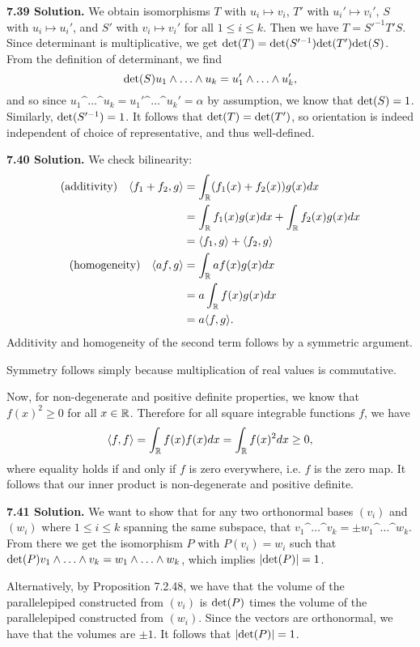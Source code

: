 \textbf{7.39 Solution.} We obtain isomorphisms $T$ with $u_i \mapsto v_i$, $T'$ with $u_i' \mapsto v_i'$, $S$ with $u_i \mapsto u_i'$, and $S'$ with $v_i \mapsto v_i'$ for all $1 \leq i \leq k$. Then we have $T = S'^{-1}T'S$. Since determinant is multiplicative, we get $\text{det}(T) = \text{det}(S'^{-1})\text{det}(T')\text{det}(S)$. From the definition of determinant, we find
\[
\f{det}(S)u_1 \^ \dots \^ u_k = u_1' \^ \dots \^ u_k',
\]
and so since $u_1 \^ \dots \^ u_k = u_1' \^ \dots \^ u_k' = \alpha$ by assumption, we know that $\text{det}(S) = 1$. Similarly, $\text{det}(S'^{-1}) = 1$. It follows that $\text{det}(T) = \text{det}(T')$, so orientation is indeed independent of choice of representative, and thus well-defined.

\textbf{7.40 Solution.} We check bilinearity:
\begin{align*}
    \text{(additivity)} ~~~ \langle f_1 + f_2, g\rangle &= \int_{\mathbb{R}} (f_1(x) + f_2(x))g(x)dx \\
    &= \int_{\mathbb{R}} f_1(x)g(x)dx + \int_{\mathbb{R}} f_2(x)g(x)dx \\
    &= \langle f_1, g\rangle + \langle f_2, g\rangle \\
    \text{(homogeneity)} ~~~ \langle af, g\rangle &= \int_{\mathbb{R}} af(x)g(x)dx \\
    &= a\int_{\mathbb{R}} f(x)g(x)dx \\
    &= a\langle f, g\rangle.
\end{align*}
Additivity and homogeneity of the second term follows by a symmetric argument.

Symmetry follows simply because multiplication of real values is commutative.

Now, for non-degenerate and positive definite properties, we know that $f(x)^2 \geq 0$ for all $x \in \mathbb{R}$. Therefore for all square integrable functions $f$, we have
\[
\langle f, f\rangle = \int_{\mathbb{R}} f(x)f(x)dx = \int_{\mathbb{R}} f(x)^2dx \geq 0,
\]
where equality holds if and only if $f$ is zero everywhere, i.e. $f$ is the zero map. It follows that our inner product is non-degenerate and positive definite.

\textbf{7.41 Solution.} We want to show that for any two orthonormal bases $(v_i)$ and $(w_i)$ where $1 \leq i \leq k$ spanning the same subspace, that $v_1 \^ \dots \^ v_k = \pm w_1 \^ \dots \^ w_k$. From there we get the isomorphism $P$ with $P(v_i) = w_i$ such that $\f{det}(P)v_1 \^ \dots \^ v_k = w_1 \^ \dots \^ w_k$, which implies $|\text{det}(P)| = 1$.

Alternatively, by Proposition 7.2.48, we have that the volume of the parallelepiped constructed from $(v_i)$ is $\text{det}(P)$ times the volume of the parallelepiped constructed from $(w_i)$. Since the vectors are orthonormal, we have that the volumes are $\pm 1$. It follows that $|\text{det}(P)| = 1$.

